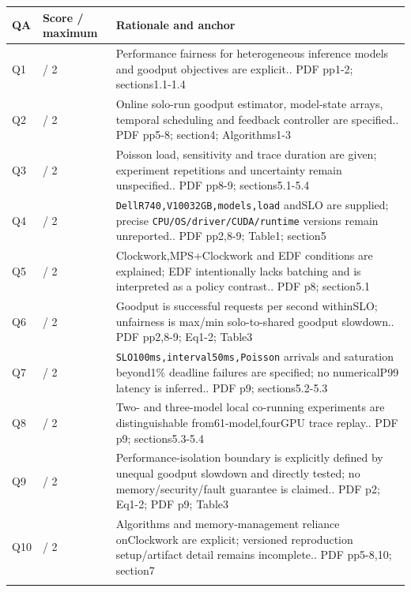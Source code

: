 \begin{longtable}{>{\raggedright\arraybackslash}p{}>{\raggedright\arraybackslash}p{}>{\raggedright\arraybackslash}p{}}
\toprule
\textbf{QA} & \textbf{Score / maximum} & \textbf{Rationale and anchor}\\\midrule\endhead
Q1 & 2 / 2 & Performance fairness for heterogeneous inference models and goodput objectives are explicit.. PDF pp1-2; sections1.1-1.4\\\addlinespace
Q2 & 2 / 2 & Online solo-run goodput estimator, model-state arrays, temporal scheduling and feedback controller are specified.. PDF pp5-8; section4; Algorithms1-3\\\addlinespace
Q3 & 1 / 2 & Poisson load, sensitivity and trace duration are given; experiment repetitions and uncertainty remain unspecified.. PDF pp8-9; sections5.1-5.4\\\addlinespace
Q4 & 1 / 2 & \nolinkurl{DellR740,V10032GB,models,load} andSLO are supplied; precise \nolinkurl{CPU/OS/driver/CUDA/runtime} versions remain unreported.. PDF pp2,8-9; Table1; section5\\\addlinespace
Q5 & 2 / 2 & Clockwork,MPS+Clockwork and EDF conditions are explained; EDF intentionally lacks batching and is interpreted as a policy contrast.. PDF p8; section5.1\\\addlinespace
Q6 & 2 / 2 & Goodput is successful requests per second withinSLO; unfairness is max/min solo-to-shared goodput slowdown.. PDF pp2,8-9; Eq1-2; Table3\\\addlinespace
Q7 & 2 / 2 & \nolinkurl{SLO100ms,interval50ms,Poisson} arrivals and saturation beyond1\% deadline failures are specified; no numericalP99 latency is inferred.. PDF p9; sections5.2-5.3\\\addlinespace
Q8 & 2 / 2 & Two- and three-model local co-running experiments are distinguishable from61-model,fourGPU trace replay.. PDF p9; sections5.3-5.4\\\addlinespace
Q9 & 2 / 2 & Performance-isolation boundary is explicitly defined by unequal goodput slowdown and directly tested; no memory/security/fault guarantee is claimed.. PDF p2; Eq1-2; PDF p9; Table3\\\addlinespace
Q10 & 1 / 2 & Algorithms and memory-management reliance onClockwork are explicit; versioned reproduction setup/artifact detail remains incomplete.. PDF pp5-8,10; section7\\\addlinespace
\bottomrule\end{longtable}

